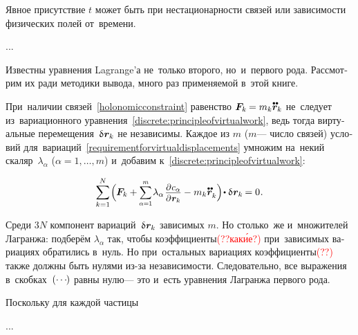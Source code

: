 \begin{otherlanguage}{russian}
\vspace{-0.15em} \noindent Явное присутствие $t$ может быть при нестационарности связей или зависимости физических полей от~времени.

...

Известны уравнения Lagrange’а не~только второго, но~и~первого рода. Рассмотрим их ради методики вывода, много раз применяемой в~этой книге.

При~наличии связей~\eqref{holonomicconstraint} равенство ${\bm{F}_k \hspace{-0.12ex} = m_k \mathdotdotabove{\bm{r}}_k}$ не~следует из~вариационного уравнения~\eqref{discrete:principleofvirtualwork}, ведь тогда виртуальные перемещения~${\variation{\hspace{.1ex}\bm{r}_k}}$ не независимы. Каждое из $m$ ($m$\:--- число связей) условий для~вариаций~\eqref{requirementforvirtualdisplacements} умножим на~некий скаляр~$\lambda_{\alpha}$ (${\alpha = 1, \ldots, m}$) и~добавим к~\eqref{discrete:principleofvirtualwork}:

\nopagebreak\vspace{-0.2em}\begin{equation}
\displaystyle \sum_{k=1}^{N} \hspace{-0.2ex} \left(^{\mathstrut} \hspace{-0.16ex} \bm{F}_k \right. \hspace{-0.32ex} + \hspace{-0.05ex}
\scalebox{0.88}[0.92]{$ \displaystyle \sum_{\alpha=1}^{m} $} \hspace{.16ex} \lambda_{\alpha} \hspace{.2ex} \scalebox{0.92}{$\displaystyle \frac{\raisemath{-0.12em}{\partial \hspace{.1ex} c_{\alpha}}}{\partial \hspace{.1ex} \bm{r}_k}$}
- \left. \hspace{-0.25ex} m_k \mathdotdotabove{\bm{r}}_k ^{\mathstrut}\right) \hspace{-0.32ex} \dotp \variation{\hspace{.1ex}\bm{r}_k} \hspace{-0.16ex} = 0 \hspace{0.1ex} .
\end{equation}

\vspace{-0.1em} \noindent Среди $3N$ компонент вариаций~${\variation{\hspace{.1ex}\bm{r}_k}}$ зависимых $m$. Но столько~же и~множителей Лагранжа: подберём $\lambda_{\alpha}$ так, чтобы коэффициенты\textcolor{red}{(??как\'{и}е?)} при~зависимых вариациях обратились в~нуль. Но при~остальных вариациях коэффициенты\textcolor{red}{(??)} также должны быть нулями из\hbox{-}за независимости. Следовательно, все выражения в~скобках~${(\cdots\hspace{-0.2ex})}$ равны нулю\:--- это и~есть уравнения Лагранжа первого рода.

Поскольку для каждой частицы

...



\end{otherlanguage}

